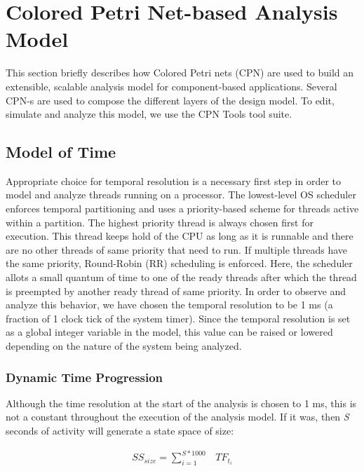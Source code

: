 \section{Colored Petri Net-based Analysis Model}
\label{sec:Colored_Petri Net-based_Analysis_Model}

This section briefly describes how Colored Petri nets (CPN) are used to build an extensible, scalable analysis model for component-based applications. Several CPN-s are used to compose the different layers of the design model. To edit, simulate and analyze this model, we use the CPN Tools \cite{CPNTools} tool suite.

\subsection{Model of Time}
Appropriate choice for temporal resolution is a necessary first step in order to model and analyze threads running on a processor. The lowest-level OS scheduler enforces temporal partitioning and uses a priority-based scheme for threads active within a partition. The highest priority thread is always chosen first for execution. This thread keeps hold of the CPU as long as it is runnable and there are no other threads of same priority that need to run. If multiple threads have the same priority, Round-Robin (RR) scheduling is enforced. Here, the scheduler allots a small quantum of time to one of the ready threads after which the thread is preempted by another ready thread of same priority. In order to observe and analyze this behavior, we have chosen the temporal resolution to be 1 ms (a fraction of 1 clock tick of the system timer). Since the temporal resolution is set as a global integer variable in the model, this value can be raised or lowered depending on the nature of the system being analyzed. 
\subsubsection{Dynamic Time Progression}
Although the time resolution at the start of the analysis is chosen to 1 ms, this is not a constant throughout the execution of the analysis model. If it was, then \emph{S} seconds of activity will generate a state space of size:

\vspace{-0.2in}

\begin{equation}
\begin{split}
SS_{size} = \sum\limits_{i=1}^{S*1000} & TF_{t_i}
\end{split}
\end{equation}

